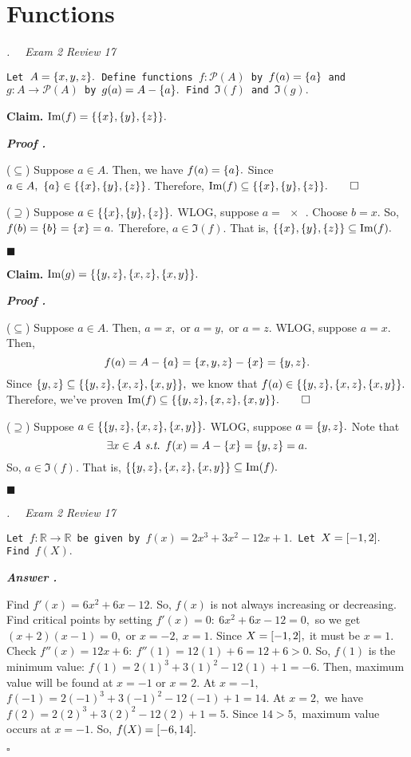 \documentclass[11pt,letter]{article}
\newcounter{nq}[section]
\newcounter{np}[section]
\newenvironment*{p}{\par\noindent\textbf{\textit{Proof \stepcounter{np}\thenp. }}\par}{\par\hfill $\blacksquare$\par}
\newenvironment*{q}[1]{\noindent\emph{\thesection.\stepcounter{nq}\thenq$\quad $ #1}\par\noindent\texttt}{}
\newenvironment*{clm}{\par\noindent\textbf{Claim. }}{\par}
\newenvironment*{ans}{\par\noindent\textbf{\textit{Answer \stepcounter{np}\thenp. }}\par}{\par\hfill $\square$\par}
\def\R{{\mathbb{R}}}
\def\pwer{{\mathcal{P}}}
\def\st{\emph{ s.t. }}
\begin{document}
\section{Functions}
\begin{framed}\begin{q}
	{Exam 2 Review 17}
	{Let $A=\qty{x,y,z}.$ Define functions $f:\pwer(A)$ by $f(a)=\qty{a}$ and $g:A\to\pwer(A)$ by $g(a)=A-\qty{a}.$ Find $\Im(f)$ and $\Im(g).$}
\end{q}\end{framed}
\begin{clm}
	$\Im(f)=\qty{\qty{x},\qty{y},\qty{z}}.$
\end{clm}
\begin{p}
	($\subseteq$) Suppose $a\in A.$ Then, we have $f(a)=\qty{a}.$ Since $a\in A,\ \qty{a}\in\qty{\qty{x},\qty{y},\qty{z}}$. Therefore, $\Im(f)\subseteq\qty{\qty{x},\qty{y},\qty{z}}.\qquad\square$\par 
	($\supseteq$) Suppose $a\in\qty{\qty{x},\qty{y},\qty{z}}.$ WLOG, suppose $a=\qty{x}.$ Choose $b=x.$ So, $f(b)=\qty{b}=\qty{x}=a.$ Therefore, $a\in\Im(f).$ That is, $\qty{\qty{x},\qty{y},\qty{z}}\subseteq\Im(f).$
\end{p}
\begin{clm}
	$\Im(g)=\qty{\qty{y,z},\qty{x,z},\qty{x,y}}.$
\end{clm}
\begin{p}
	($\subseteq$) Suppose $a\in A.$ Then, $a=x,$ or $a=y,$ or $a=z.$ WLOG, suppose $a=x.$ Then, \[f(a)=A-\qty{a}=\qty{x,y,z}-\qty{x}=\qty{y,z}.\] Since $\qty{y,z}\subseteq\qty{\qty{y,z},\qty{x,z},\qty{x,y}},$ we know that $f(a)\in\qty{\qty{y,z},\qty{x,z},\qty{x,y}}.$ Therefore, we've proven $\Im(f)\subseteq\qty{\qty{y,z},\qty{x,z},\qty{x,y}}.\qquad\square$\par 
	($\supseteq$) Suppose $a\in\qty{\qty{y,z},\qty{x,z},\qty{x,y}}.$ WLOG, suppose $a=\qty{y,z}.$ Note that \[\exists x\in A\st f(x)=A-\qty{x}=\qty{y,z}=a.\] So, $a\in\Im(f).$ That is, $\qty{\qty{y,z},\qty{x,z},\qty{x,y}}\subseteq\Im(f).$
\end{p}

\begin{framed}\begin{q}
	{Exam 2 Review 17}
	{Let $f:\R\to\R$ be given by $f(x)=2x^3+3x^2-12x+1.$ Let $X=\qty[-1,2].$ Find $f(X).$}
\end{q}\end{framed}
\begin{ans}
	Find $f'(x)=6x^2+6x-12.$ So, $f(x)$ is not always increasing or decreasing. Find critical points by setting $f'(x)=0:\ 6x^2+6x-12=0,$ so we get $(x+2)(x-1)=0,$ or $x=-2,\ x=1.$ Since $X=\qty[-1,2],$ it must be $x=1.$ Check $f''(x)=12x+6:\ f''(1)=12(1)+6=12+6>0.$ So, $f(1)$ is the minimum value: $f(1)=2(1)^3+3(1)^2-12(1)+1=-6.$ Then, maximum value will be found at $x=-1$ or $x=2.$ At $x=-1,$ $f(-1)=2(-1)^3+3(-1)^2-12(-1)+1=14.$ At $x=2,$ we have $f(2)=2(2)^3+3(2)^2-12(2)+1=5.$ Since $14>5,$ maximum value occurs at $x=-1.$ So, $f(X)=\qty[-6,14].$
\end{ans}
\end{document}
